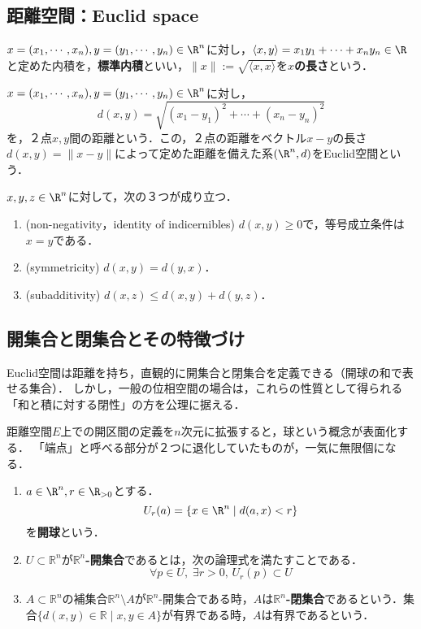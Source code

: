 \documentclass[uplatex,dvipdfmx]{jsreport}
\begin{document}
\subsection{距離空間：Euclid space}

\begin{definition}
    $x=(x_1,\cdots,x_n),y=(y_1,\cdots,y_n)\in\R^n$に対し，$\langle x,y\rangle =x_1y_1+\cdots +x_ny_n\in\R$と定めた内積を，\textbf{標準内積}といい，$\|x\|:=\sqrt{\langle x,x\rangle}$を\textbf{$x$の長さ}という．
\end{definition}
\begin{definition}
    $x=(x_1,\cdots,x_n),y=(y_1,\cdots,y_n)\in\R^n$に対し，
    \[ d(x,y)=\sqrt{(x_1-y_1)^2+\cdots +(x_n-y_n)^2} \]
    を，２点$x,y$間の距離という．この，２点の距離をベクトル$x-y$の長さ$d(x,y)=\|x-y\|$によって定めた距離を備えた系$(\R^n,d)$をEuclid空間という．
\end{definition}

\begin{proposition}[距離の公理]$x,y,z\in\R^n$に対して，次の３つが成り立つ．
    \begin{enumerate}
        \item (non-negativity，identity of indicernibles) $d(x,y)\ge 0$で，等号成立条件は$x=y$である．
        \item (symmetricity) $d(x,y)=d(y,x)$．
        \item (subadditivity) $d(x,z)\le d(x,y)+d(y,z)$．
    \end{enumerate}
\end{proposition}

\subsection{開集合と閉集合とその特徴づけ}

\begin{screen}
    Euclid空間は距離を持ち，直観的に開集合と閉集合を定義できる（開球の和で表せる集合）．
    しかし，一般の位相空間の場合は，これらの性質として得られる「和と積に対する閉性」の方を公理に据える．
\end{screen}

距離空間$E$上での開区間の定義を$n$次元に拡張すると，球という概念が表面化する．
「端点」と呼べる部分が２つに退化していたものが，一気に無限個になる．
\begin{definition}[開集合]\mbox{}
    \begin{enumerate}
        \item $a\in\R^n, r\in\R_{>0}$とする．
        \[U_r(a)=\{ x\in\R^n \mid d(a,x)<r \}\]
        を\textbf{開球}という．
        \item $U\subset\mathbb{R}^n$が\textbf{$\mathbb{R}^n$-開集合}であるとは，次の論理式を満たすことである．
        \[\forall p\in U,\; \exists r >0,\, U_r (p)\subset U\]
        \item $A\subset\mathbb{R}^n$の補集合$\mathbb{R}^n\setminus A$が$\mathbb{R}^n$-開集合である時，$A$は\textbf{$\mathbb{R}^n$-閉集合}であるという．集合$\{d(x,y)\in\mathbb{R}\mid x,y\in A\}$が有界である時，$A$は有界であるという．
    \end{enumerate}
\end{definition}
\end{document}
